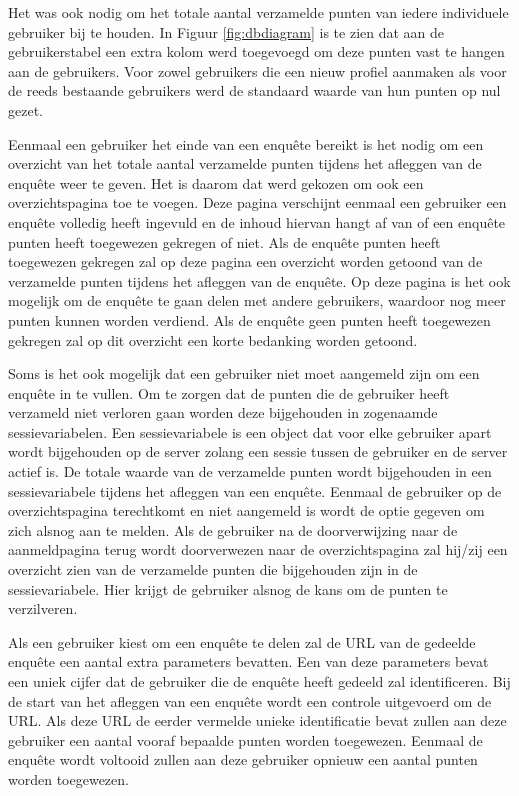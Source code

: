 Het was ook nodig om het totale aantal verzamelde punten van iedere individuele gebruiker bij te houden. In Figuur \ref{fig:dbdiagram} is te zien dat aan de gebruikerstabel een extra kolom werd toegevoegd om deze punten vast te hangen aan de gebruikers. Voor zowel gebruikers die een nieuw profiel aanmaken als voor de reeds bestaande gebruikers werd de standaard waarde van hun punten op nul gezet.

Eenmaal een gebruiker het einde van een enquête bereikt is het nodig om een overzicht van het totale aantal verzamelde punten tijdens het afleggen van de enquête weer te geven. Het is daarom dat werd gekozen om ook een overzichtspagina toe te voegen. Deze pagina verschijnt eenmaal een gebruiker een enquête volledig heeft ingevuld en de inhoud hiervan hangt af van of een enquête punten heeft toegewezen gekregen of niet. Als de enquête punten heeft toegewezen gekregen zal op deze pagina een overzicht worden getoond van de verzamelde punten tijdens het afleggen van de enquête. Op deze pagina is het ook mogelijk om de enquête te gaan delen met andere gebruikers, waardoor nog meer punten kunnen worden verdiend. Als de enquête geen punten heeft toegewezen gekregen zal op dit overzicht een korte bedanking worden getoond.

Soms is het ook mogelijk dat een gebruiker niet moet aangemeld zijn om een enquête in te vullen. Om te zorgen dat de punten die de gebruiker heeft verzameld niet verloren gaan worden deze bijgehouden in zogenaamde sessievariabelen. Een sessievariabele is een object dat voor elke gebruiker apart wordt bijgehouden op de server zolang een sessie tussen de gebruiker en de server actief is. De totale waarde van de verzamelde punten wordt bijgehouden in een sessievariabele tijdens het afleggen van een enquête. Eenmaal de gebruiker op de overzichtspagina terechtkomt en niet aangemeld is wordt de optie gegeven om zich alsnog aan te melden. Als de gebruiker na de doorverwijzing naar de aanmeldpagina terug wordt doorverwezen naar de overzichtspagina zal hij/zij een overzicht zien van de verzamelde punten die bijgehouden zijn in de sessievariabele. Hier krijgt de gebruiker alsnog de kans om de punten te verzilveren.

Als een gebruiker kiest om een enquête te delen zal de URL van de gedeelde enquête een aantal extra parameters bevatten. Een van deze parameters bevat een uniek cijfer dat de gebruiker die de enquête heeft gedeeld zal identificeren. Bij de start van het afleggen van een enquête wordt een controle uitgevoerd om de URL. Als deze URL de eerder vermelde unieke identificatie bevat zullen aan deze gebruiker een aantal vooraf bepaalde punten worden toegewezen. Eenmaal de enquête wordt voltooid zullen aan deze gebruiker opnieuw een aantal punten worden toegewezen.

